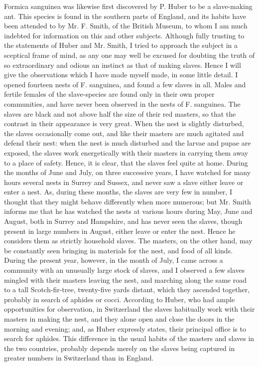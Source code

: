 \indent Formica sanguinea was likewise first discovered by P. Huber to be a slave-making ant. This species is found in the southern parts of England, and its habits have been attended to by Mr. F. Smith, of the British Museum, to whom I am much indebted for information on this and other subjects. Although fully trusting to the statements of Huber and Mr. Smith, I tried to approach the subject in a sceptical frame of mind, as any one may well be excused for doubting the truth of so extraordinary and odious an instinct as that of making slaves. Hence I will give the observations which I have made myself made, in some little detail. I opened fourteen nests of F. sanguinea, and found a few slaves in all. Males and fertile females of the slave-species are found only in their own proper communities, and have never been observed in the nests of F. sanguinea. The slaves are black and not above half the size of their red masters, so that the contrast in their appearance is very great. When the nest is slightly disturbed, the slaves occasionally come out, and like their masters are much agitated and defend their nest: when the nest is much disturbed and the larvae and pupae are exposed, the slaves work energetically with their masters in carrying them away to a place of safety. Hence, it is clear, that the slaves feel quite at home. During the months of June and July, on three successive years, I have watched for many hours several nests in Surrey and Sussex, and never saw a slave either leave or enter a nest. As, during these months, the slaves are very few in number, I thought that they might behave differently when more numerous; but Mr. Smith informs me that he has watched the nests at various hours during May, June and August, both in Surrey and Hampshire, and has never seen the slaves, though present in large numbers in August, either leave or enter the nest. Hence he considers them as strictly household slaves. The masters, on the other hand, may be constantly seen bringing in materials for the nest, and food of all kinds. During the present year, however, in the month of July, I came across a community with an unusually large stock of slaves, and I observed a few slaves mingled with their masters leaving the nest, and marching along the same road to a tall Scotch-fir-tree, twenty-five yards distant, which they ascended together, probably in search of aphides or cocci. According to Huber, who had ample opportunities for observation, in Switzerland the slaves habitually work with their masters in making the nest, and they alone open and close the doors in the morning and evening; and, as Huber expressly states, their principal office is to search for aphides. This difference in the usual habits of the masters and slaves in the two countries, probably depends merely on the slaves being captured in greater numbers in Switzerland than in England.\\
